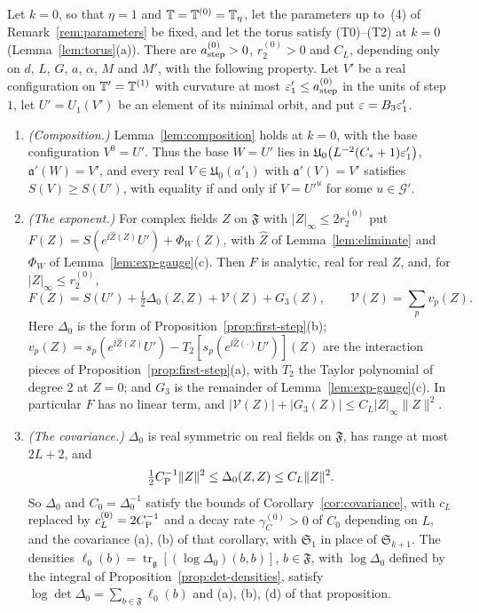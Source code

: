 \begin{lemma}\label{lem:first-step-formula}
Let $k=0$, so that $\eta=1$ and $\mathbb T=\mathbb T^{(0)}=\mathbb T_\eta$, let the parameters up to~(4) of Remark~\ref{rem:parameters} be fixed, and let the torus satisfy (T0)--(T2) at $k=0$ (Lemma~\ref{lem:torus}(a)). There are $a^{(0)}_{\rm step}>0$, $r^{(0)}_2>0$ and $C_L$, depending only on $d$, $L$, $G$, $a$, $\alpha$, $M$ and $M'$, with the following property. Let $V'$ be a real configuration on $\mathbb T'=\mathbb T^{(1)}$ with curvature at most $\varepsilon'_1\le a^{(0)}_{\rm step}$ in the units of step~$1$, let $U'=U_1(V')$ be an element of its minimal orbit, and put $\varepsilon=B_3\varepsilon'_1$.
\begin{enumerate}[label=(\alph*)]
\item \emph{(Composition.)} Lemma~\ref{lem:composition} holds at $k=0$, with the base configuration $V^0=U'$. Thus the base $W=U'$ lies in $\mathfrak U_0\big(L^{-2}(C_*+1)\varepsilon'_1\big)$, $\mathfrak a'(W)=V'$, and every real $V\in\mathfrak U_0(a'_1)$ with $\mathfrak a'(V)=V'$ satisfies $S(V)\ge S(U')$, with equality if and only if $V=U'^u$ for some $u\in\mathcal G'$.
\item \emph{(The exponent.)} For complex fields $Z$ on $\mathfrak F$ with $|Z|_\infty\le2r^{(0)}_2$ put $F(Z)=S(e^{\ii\hat Z(Z)}U')+\Phi_W(Z)$, with $\hat Z$ of Lemma~\ref{lem:eliminate} and $\Phi_W$ of Lemma~\ref{lem:exp-gauge}(c). Then $F$ is analytic, real for real $Z$, and, for $|Z|_\infty\le r^{(0)}_2$,
\[
F(Z)=S(U')+\tfrac12\Delta_0(Z,Z)+\mathcal V(Z)+G_3(Z),\qquad\mathcal V(Z)=\sum_pv_p(Z).
\]
Here $\Delta_0$ is the form of Proposition~\ref{prop:first-step}(b); $v_p(Z)=s_p(e^{\ii\hat Z(Z)}U')-T_2[s_p(e^{\ii\hat Z(\cdot)}U')](Z)$ are the interaction pieces of Proposition~\ref{prop:first-step}(a), with $T_2$ the Taylor polynomial of degree $2$ at $Z=0$; and $G_3$ is the remainder of Lemma~\ref{lem:exp-gauge}(c). In particular $F$ has no linear term, and $|\mathcal V(Z)|+|G_3(Z)|\le C_L|Z|_\infty\|Z\|^2$.
\item \emph{(The covariance.)} $\Delta_0$ is real symmetric on real fields on $\mathfrak F$, has range at most $2L+2$, and
\[
\tfrac12C_{\rm P}^{-1}\|Z\|^2\le\Delta_0(Z,Z)\le C_L\|Z\|^2 .
\]
So $\Delta_0$ and $C_0=\Delta_0^{-1}$ satisfy the bounds of Corollary~\ref{cor:covariance}, with $c_L$ replaced by $c^{(0)}_L=2C_{\rm P}^{-1}$ and a decay rate $\gamma^{(0)}_C>0$ of $C_0$ depending on $L$, and the covariance (a), (b) of that corollary, with $\mathfrak S_1$ in place of $\mathfrak S_{k+1}$. The densities $\ell_0(b)=\operatorname{tr}_{\mathfrak g}[(\log\Delta_0)(b,b)]$, $b\in\mathfrak F$, with $\log\Delta_0$ defined by the integral of Proposition~\ref{prop:det-densities}, satisfy $\log\det\Delta_0=\sum_{b\in\mathfrak F}\ell_0(b)$ and (a), (b), (d) of that proposition.

\end{enumerate}
\end{lemma}
